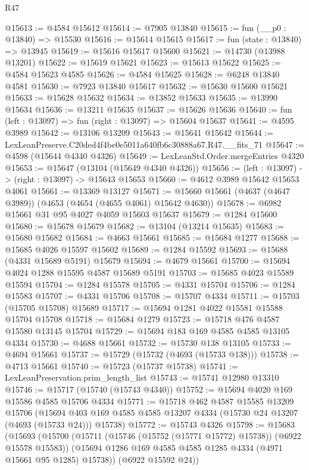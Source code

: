 \begin{lexlean}{R47}
\begin{coremodule}
@15613 := @4584 @15612
@15614 := @7905 @13840
@15615 := fun (__p0 : @13840) => @15530
@15616 := @15614 @15615
@15617 := fun (state : @13840) => @13945
@15619 := @15616 @15617 @15600
@15621 := @14730 (@13988 @13201)
@15622 := @15619 @15621
@15623 := @15613 @15622
@15625 := @4584 @15623 @4585
@15626 := @4584 @15625
@15628 := @6248 @13840 @4581
@15630 := @7923 @13840 @15617
@15632 := @15630 @15600 @15621
@15633 := @15628 @15632
@15634 := @13852 @15633
@15635 := @13990 @15634
@15636 := @13211 @15635
@15637 := @15626 @15636
@15640 := fun (left : @13097) => fun (right : @13097) => @15604 @15637
@15641 := @4595 @3989
@15642 := @13106 @13209
@15643 := @15641 @15642
@15644 := LexLeanPreserve.C20ded4f4be0e5011a640fb6c30888a67.R47.__fits_71
@15647 := @4598 (@15644 @4340 @4326)
@15649 := LexLeanStd.Order.mergeEntries @4320
@15653 := @15647 (@13104 (@15649 @4340 @4326))
@15656 := (left : @13097) -> (right : @13097) -> @15643 @15653
@15660 := @4612 @3989 @15642 @15653 @4061
@15661 := @13369 @13127
@15671 := @15660 @15661 (@4637 (@4647 @3989)) (@4653 (@4654 (@4655 @4061) @15642 @4630))
@15678 := @6982 @15661 @31 @95 @4027 @4059 @15603 @15637
@15679 := @1284 @15600
@15680 := @15678 @15679
@15682 := @13104 (@13214 @15635)
@15683 := @15680 @15682
@15684 := @4663 @15661
@15685 := @15684 @1277
@15688 := @15685 @4026 @15597 @15602
@15689 := @1284 @15592
@15693 := @15688 (@4331 @15689 @5191) @15679
@15694 := @4679 @15661
@15700 := @15694 @4024 @1288 @15595 @4587 @15689 @5191
@15703 := @15685 @4023 @15589 @15594
@15704 := @1284 @15578
@15705 := @4331 @15704
@15706 := @1284 @15583
@15707 := @4331 @15706
@15708 := @15707 @4334
@15711 := @15703 (@15705 @15708) @15689
@15717 := @15694 @1281 @4022 @15581 @15588 @15704 @15708
@15718 := @15684 @1279
@15723 := @15718 @476 @4587 @15580 @13145 @15704
@15729 := @15694 @183 @169 @4585 @4585 @13105 @4334
@15730 := @4688 @15661
@15732 := @15730 @138 @13105
@15733 := @4694 @15661
@15737 := @15729 (@15732 (@4693 (@15733 @138)))
@15738 := @4713 @15661
@15740 := @15723 (@15737 @15738)
@15741 := LexLeanPreservation.prim_length_list
@15743 := @15741 @12980 @13310
@15746 := @15717 (@15740 (@15743 @4340))
@15752 := @15694 @4020 @169 @15586 @4585 @15706 @4334
@15771 := @15718
    @462
    @4587
    @15585
    @13209
    @15706
    (@15694 @403 @169 @4585 @4585 @13207 @4334 (@15730 @24 @13207 (@4693 (@15733 @24))) @15738)
@15772 := @15743 @4326
@15798 := @15683
    (@15693
      (@15700
        (@15711 (@15746 (@15752 (@15771 @15772) @15738)) (@6922 @15578 @15583))
        (@15694 @1286 @169 @4585 @4585 @1285 @4334 (@4971 @15661 @95 @1285) @15738))
      (@6922 @15592 @24))

\end{coremodule}
\end{lexlean}
